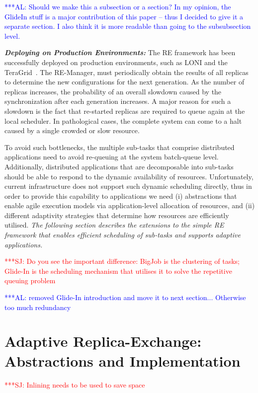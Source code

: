 \documentclass{rspublic}
\newcommand{\alnote}[1]{ {\textcolor{blue} { ***AL: #1 }}}
\newcommand{\jhanote}[1]{ {\textcolor{red} { ***SJ: #1 }}}
\newcommand{\alnote}[1]{}
\newcommand{\jhanote}[1]{}
\begin{document}
\alnote{Should we make this a subsection or a section? In my opinion,
the GlideIn stuff is a major contribution of this paper -- thus I decided to
give it a separate section. I also think it is more readable than going to the
subsubsection level.}           
         
\noindent
{\it \bf Deploying on Production Environments:} The RE framework has 
been successfully deployed on production
environments, such as LONI and the TeraGrid~\citep{Luckow:2008la}.
The RE-Manager, must periodically obtain the results of all replicas
to determine the new configurations for the next generation.  As the
number of replicas increases, the probability of an overall slowdown
caused by the synchronization after each
generation increases.  A major reason for such a slowdown is the fact that
re-started replicas are required to queue again at
the local scheduler.  In pathological cases, the complete system can
come to a halt caused by a single crowded or slow resource.

To avoid such bottlenecks, the multiple sub-tasks that comprise
distributed applications need to avoid re-queuing at the system
batch-queue level.  Additionally, distributed applications that are
decomposable into sub-tasks should be able to respond to the dynamic
availability of resources.  Unfortunately, current infrastructure does
not support such dynamic scheduling directly, thus in order to provide
this capability to applications we need (i) abstractions that enable
agile execution models via application-level allocation of resources,
and (ii) different adaptivity strategies that determine how resources
are efficiently utilised.  {\it The following section describes the
  extensions to the simple RE framework that enables efficient
  scheduling of sub-tasks and supports adaptive applications.}




\jhanote{Do you see the important difference: BigJob is the clustering
  of tasks; Glide-In is the scheduling mechanism that utilises it to
  solve the repetitive queuing problem}

\alnote{removed Glide-In introduction and move it to next
  section... Otherwise too much redundancy}
\vspace{-0.15in}
\section{Adaptive Replica-Exchange: Abstractions and Implementation}
\label{sec:glidein}
\jhanote{Inlining needs to be used to save space}
\end{document}
